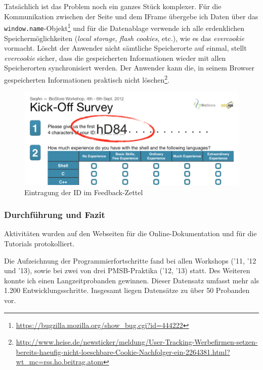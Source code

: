 \begin{furtherreading}[frametitle={Stabiles Browser-Fingerprinting}]
Tatsächlich ist das Problem noch ein ganzes Stück komplexer. Für die Kommunikation zwischen der Seite und dem IFrame übergebe ich Daten über das \texttt{window.name}-Objekt\footnote{\url{https://bugzilla.mozilla.org/show_bug.cgi?id=444222}} und für die Datenablage verwende ich alle erdenklichen Speichermöglichkeiten (\textit{local storage}, \textit{flash cookies}, etc.), wie es das \textit{evercookie} \citep{Kamkar:FIOYXZjo} vormacht. Löscht der Anwender nicht sämtliche Speicherorte auf einmal, stellt \textit{evercookie} sicher, dass die gespeicherten Informationen wieder mit allen Speicherorten synchronisiert werden. Der Anwender kann die, in seinem Browser gespeicherten Informationen praktisch nicht löschen\footnote{\url{http://www.heise.de/newsticker/meldung/User-Tracking-Werbefirmen-setzen-bereits-haeufig-nicht-loeschbare-Cookie-Nachfolger-ein-2264381.html?wt_mc=rss.ho.beitrag.atom}}.
\end{furtherreading}

\begin{figure}
  \centering
    \includegraphics[width=0.75\linewidth]{Figures/survey-id.png}
  \caption{Eintragung der ID im Feedback-Zettel}
  \label{fig:survey-id}
\end{figure}
  
  
  
\subsubsection{Durchführung und Fazit}
\label{sec:phase2-programmierfortschritte-durchfuhrung}

Aktivitäten wurden auf den Webseiten für die Online-Dokumentation und für die Tutorials protokolliert.

Die Aufzeichnung der Programmierfortschritte fand bei allen Workshops ('11, '12 und '13), sowie bei zwei von drei PMSB-Praktika ('12, '13) statt. Des Weiteren konnte ich einen Langzeitprobanden gewinnen. Dieser Datensatz umfasst mehr als 1.200 Entwicklungsschritte. Insgesamt liegen Datensätze zu über 50 Probanden vor.

